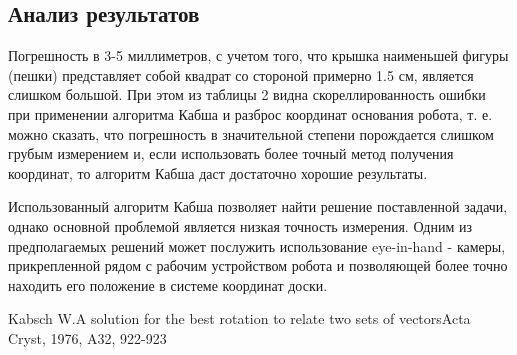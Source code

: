 \documentclass[a4paper,12pt]{extarticle}
\begin{document}
\subsection{Анализ результатов}

Погрешность в 3-5 миллиметров, с учетом того, что крышка наименьшей фигуры (пешки) представляет собой квадрат со стороной примерно 1.5 см, является слишком большой. При этом из таблицы 2 видна скореллированность ошибки при применении алгоритма Кабша и разброс координат основания робота, т. е. можно сказать, что погрешность в значительной степени порождается слишком грубым измерением и, если использовать более точный метод получения координат, то алгоритм Кабша даст достаточно хорошие результаты.

\pagebreak

Использованный алгоритм Кабша позволяет найти решение поставленной задачи, однако основной проблемой является низкая точность измерения. Одним из предполагаемых решений может послужить использование eye-in-hand - камеры, прикрепленной рядом с рабочим устройством робота и позволяющей более точно находить его положение в системе координат доски.

\begin{thebibliography}{1}
 Kabsch W.\flqq A solution for the best rotation to relate two sets of vectors\frqq Acta Cryst, 1976, A32, 922-923
\end{thebibliography}
\end{document}
